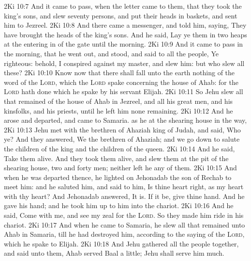\vs 2Ki 10:7 And it came to pass, when the letter came to them, that they took the king's sons, and slew seventy persons, and put their heads in baskets, and sent him  to Jezreel.
\vs 2Ki 10:8 And there came a messenger, and told him, saying, They have brought the heads of the king's sons. And he said, Lay ye them in two heaps at the entering in of the gate until the morning.
\vs 2Ki 10:9 And it came to pass in the morning, that he went out, and stood, and said to all the people, Ye  righteous: behold, I conspired against my master, and slew him: but who slew all these?
\vs 2Ki 10:10 Know now that there shall fall unto the earth nothing of the word of the \textsc{Lord}, which the \textsc{Lord} spake concerning the house of Ahab: for the \textsc{Lord} hath done  which he spake by his servant Elijah.
\vs 2Ki 10:11 So Jehu slew all that remained of the house of Ahab in Jezreel, and all his great men, and his kinsfolks, and his priests, until he left him none remaining.
\vs 2Ki 10:12 And he arose and departed, and came to Samaria.  as he  at the shearing house in the way,
\vs 2Ki 10:13 Jehu met with the brethren of Ahaziah king of Judah, and said, Who  ye? And they answered, We  the brethren of Ahaziah; and we go down to salute the children of the king and the children of the queen.
\vs 2Ki 10:14 And he said, Take them alive. And they took them alive, and slew them at the pit of the shearing house,  two and forty men; neither left he any of them.
\vs 2Ki 10:15 And when he was departed thence, he lighted on Jehonadab the son of Rechab  to meet him: and he saluted him, and said to him, Is thine heart right, as my heart  with thy heart? And Jehonadab answered, It is. If it be, give  thine hand. And he gave  his hand; and he took him up to him into the chariot.
\vs 2Ki 10:16 And he said, Come with me, and see my zeal for the \textsc{Lord}. So they made him ride in his chariot.
\vs 2Ki 10:17 And when he came to Samaria, he slew all that remained unto Ahab in Samaria, till he had destroyed him, according to the saying of the \textsc{Lord}, which he spake to Elijah.
\vs 2Ki 10:18 And Jehu gathered all the people together, and said unto them, Ahab served Baal a little;  Jehu shall serve him much.
